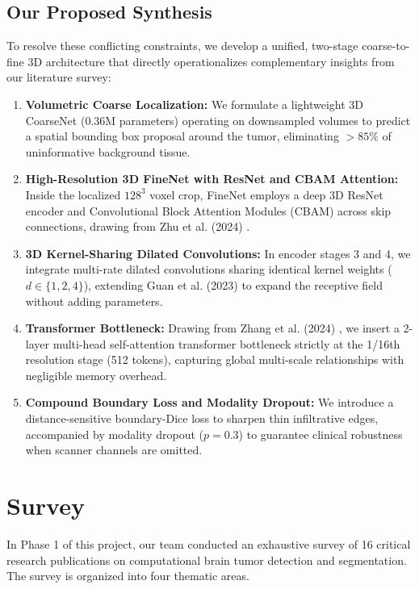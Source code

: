 \documentclass[12pt, a4paper]{article}
\begin{document}
\subsection{Our Proposed Synthesis}
To resolve these conflicting constraints, we develop a unified, two-stage coarse-to-fine 3D architecture that directly operationalizes complementary insights from our literature survey:
\begin{enumerate}[leftmargin=*, itemsep=4pt]
    \item \textbf{Volumetric Coarse Localization:} We formulate a lightweight 3D CoarseNet (0.36M parameters) operating on downsampled volumes to predict a spatial bounding box proposal around the tumor, eliminating $>85\%$ of uninformative background tissue.
    \item \textbf{High-Resolution 3D FineNet with ResNet and CBAM Attention:} Inside the localized $128^3$ voxel crop, FineNet employs a deep 3D ResNet encoder and Convolutional Block Attention Modules (CBAM) across skip connections, drawing from Zhu et al. (2024) \cite{zhu2024improvedunet}.
    \item \textbf{3D Kernel-Sharing Dilated Convolutions:} In encoder stages 3 and 4, we integrate multi-rate dilated convolutions sharing identical kernel weights ($d \in \{1, 2, 4\}$), extending Guan et al. (2023) \cite{guan2023multiview} to expand the receptive field without adding parameters.
    \item \textbf{Transformer Bottleneck:} Drawing from Zhang et al. (2024) \cite{zhang2024augtransunet}, we insert a 2-layer multi-head self-attention transformer bottleneck strictly at the 1/16th resolution stage (512 tokens), capturing global multi-scale relationships with negligible memory overhead.
    \item \textbf{Compound Boundary Loss and Modality Dropout:} We introduce a distance-sensitive boundary-Dice loss to sharpen thin infiltrative edges, accompanied by modality dropout ($p=0.3$) to guarantee clinical robustness when scanner channels are omitted.
\end{enumerate}

\section{Survey}

In Phase 1 of this project, our team conducted an exhaustive survey of 16 critical research publications on computational brain tumor detection and segmentation. The survey is organized into four thematic areas.
\end{document}
